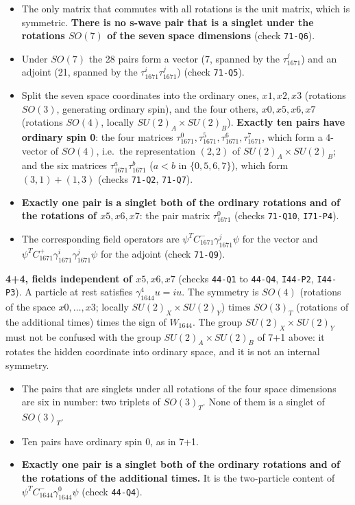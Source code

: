 \documentclass[
  10pt,
]{article}
\providecommand{\tightlist}{%
  \setlength{\itemsep}{0pt}\setlength{\parskip}{0pt}}
\begin{document}
\begin{itemize}
\tightlist
\item
  The only matrix that commutes with all rotations is the unit matrix,
  which is symmetric. \textbf{There is no s-wave pair that is a singlet
  under the rotations \(SO(7)\) of the seven space dimensions} (check
  \texttt{71-Q6}).
\item
  Under \(SO(7)\) the 28 pairs form a vector (7, spanned by the
  \(\tau_{1671}^j\)) and an adjoint (21, spanned by the
  \(\tau_{1671}^i\tau_{1671}^j\)) (check \texttt{71-Q5}).
\item
  Split the seven space coordinates into the ordinary ones, \(x1,x2,x3\)
  (rotations \(SO(3)\), generating ordinary spin), and the four others,
  \(x0,x5,x6,x7\) (rotations \(SO(4)\), locally
  \(SU(2)_A\times SU(2)_B\)). \textbf{Exactly ten pairs have ordinary
  spin 0}: the four matrices
  \(\tau_{1671}^0,\tau_{1671}^5,\tau_{1671}^6,\tau_{1671}^7\), which
  form a 4-vector of \(SO(4)\), i.e.~the representation \((2,2)\) of
  \(SU(2)_A\times SU(2)_B\); and the six matrices
  \(\tau_{1671}^a\tau_{1671}^b\) (\(a<b\) in \(\{0,5,6,7\}\)), which
  form \((3,1)+(1,3)\) (checks \texttt{71-Q2}, \texttt{71-Q7}).
\item
  \textbf{Exactly one pair is a singlet both of the ordinary rotations
  and of the rotations of \(x5,x6,x7\)}: the pair matrix
  \(\tau_{1671}^0\) (checks \texttt{71-Q10}, \texttt{I71-P4}).
\item
  The corresponding field operators are
  \(\psi^TC_{1671}^{-}\gamma_{1671}^j\psi\) for the vector and
  \(\psi^TC_{1671}^{+}\gamma_{1671}^i\gamma_{1671}^j\psi\) for the
  adjoint (check \texttt{71-Q9}).
\end{itemize}

\textbf{4+4, fields independent of \(x5,x6,x7\)} (checks \texttt{44-Q1}
to \texttt{44-Q4}, \texttt{I44-P2}, \texttt{I44-P3}). A particle at rest
satisfies \(\gamma_{1644}^4u=iu\). The symmetry is \(SO(4)\) (rotations
of the space \(x0,\dots,x3\); locally \(SU(2)_X\times SU(2)_Y\)) times
\(SO(3)_T\) (rotations of the additional times) times the sign of
\(W_{1644}\). The group \(SU(2)_X\times SU(2)_Y\) must not be confused
with the group \(SU(2)_A\times SU(2)_B\) of 7+1 above: it rotates the
hidden coordinate into ordinary space, and it is not an internal
symmetry.

\begin{itemize}
\tightlist
\item
  The pairs that are singlets under all rotations of the four space
  dimensions are six in number: two triplets of \(SO(3)_T\). None of
  them is a singlet of \(SO(3)_T\).
\item
  Ten pairs have ordinary spin 0, as in 7+1.
\item
  \textbf{Exactly one pair is a singlet both of the ordinary rotations
  and of the rotations of the additional times.} It is the two-particle
  content of \(\psi^TC_{1644}^{-}\gamma_{1644}^0\psi\) (check
  \texttt{44-Q4}).
\end{itemize}
\end{document}
